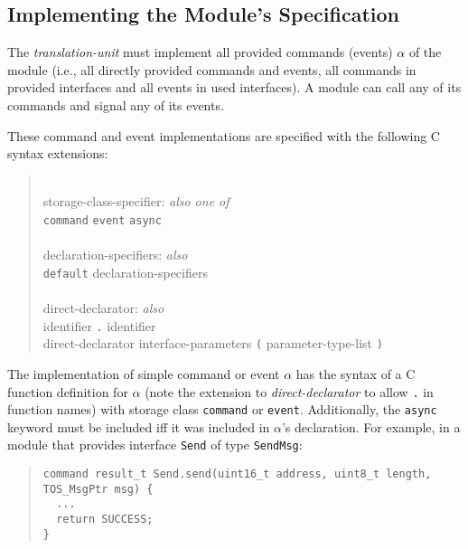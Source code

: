 \documentclass[11pt,letterpaper]{article}
\newcommand{\kw}[1]{{\tt #1}}
\newcommand{\code}[1]{{\tt #1}}
\newcommand{\grammarshift}{\vspace*{-.7cm}}
\newcommand{\grammarindent}{\hspace*{2cm}\= \\ \kill}
\begin{document}
\subsection{Implementing the Module's Specification}

The \emph{translation-unit} must implement all provided commands
(events) $\alpha$ of the module (i.e., all directly provided commands and
events, all commands in provided interfaces and all events in used
interfaces). A module can call any of its commands and signal any of its
events.

These command and event implementations are specified with the following C
syntax extensions:
\begin{quote} \grammarshift \em \begin{tabbing}
\grammarindent
storage-class-specifier: \emph{also one of}\\
\>	\kw{command} \kw{event} \kw{async}\\
\\
declaration-specifiers: \emph{also}\\
\>	\kw{default} declaration-specifiers\\
\\
direct-declarator: \emph{also}\\
\>	identifier \kw{.} identifier \\
\>	direct-declarator interface-parameters \kw{(} parameter-type-list \kw{)}\\
\end{tabbing} \end{quote}
The implementation of simple command or event $\alpha$ has the syntax of a
C function definition for $\alpha$ (note the extension to
\emph{direct-declarator} to allow \code{.} in function names) with storage
class \kw{command} or \kw{event}. Additionally, the \kw{async} keyword must
be included iff it was included in $\alpha$'s declaration. For example, in
a module that provides interface \code{Send} of type \kw{SendMsg}:
\begin{quote} \begin{verbatim}
command result_t Send.send(uint16_t address, uint8_t length, TOS_MsgPtr msg) {
  ...
  return SUCCESS;
}
\end{verbatim} \end{quote}
\end{document}
